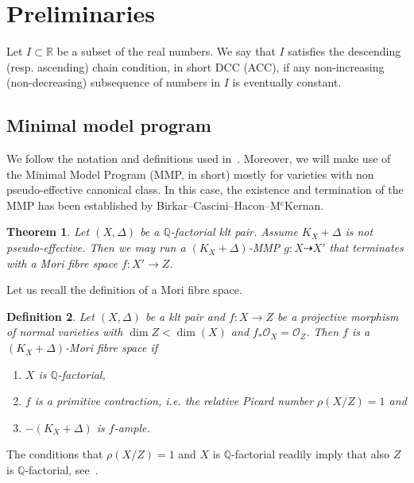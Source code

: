 \documentclass{amsart}[12pt,a4paper]
\newtheorem{theorem}{Theorem}[section]
\newtheorem{definition}[theorem]{Definition}
\theoremstyle{definition}
\newcommand{\qq}{\mathbb{Q}}
\begin{document}

\section{Preliminaries}\label{prelim.sec}

Let $I \subset \mathbb{R}$ be a subset of the real numbers. We say that $I$ satisfies the descending (resp. ascending) 
chain condition, in short DCC (ACC), if any non-increasing (non-decreasing) subsequence of numbers in $I$ is eventually constant.

\subsection{Minimal model program} 
We follow the notation and definitions used in~\cite{KM}. 
Moreover, we will make use of the Minimal Model Program (MMP, in short) mostly for varieties with non pseudo-effective canonical class. 
In this case, the existence and termination of the MMP  has been established by Birkar--Cascini--Hacon--M$^\text{c}$Kernan. 

\begin{theorem}\label{mmp}\cite[Corollary~1.3.3]{BCHM}
Let $(X,\Delta)$ be a $\qq$-factorial klt pair. Assume $K_{X}+\Delta$ is not pseudo-effective. 
Then we may run a $(K_{X}+\Delta)$-MMP $g \colon X \dashrightarrow X'$ that terminates with a Mori fibre space $f\colon X' 	\rightarrow Z$.
\end{theorem}

Let us recall the definition of a Mori fibre space. 

\begin{definition}
Let $(X,\Delta)$ be a klt pair and $f \colon X\rightarrow Z$ be a projective morphism of normal varieties with $\dim Z <\dim(X)$ and $f_\ast \mathcal{O}_X=\mathcal{O}_Z$. 
Then $f$ is a $(K_X+\Delta)$-Mori fibre space if 
	\begin{enumerate}
		\item $X$ is $\qq$-factorial,
		\item $f$ is a primitive contraction, i.e. the relative Picard number $\rho(X/Z)=1$ and 
		\item $-(K_{X}+\Delta)$ is $f$-ample.
	\end{enumerate}
\end{definition}

The conditions that  $\rho(X/Z)=1$ and $X$ is $\mathbb{Q}$-factorial readily imply that also $Z$ is $\mathbb{Q}$-factorial, see~\cite[Proposition~3.36]{KM}.
\end{document}
